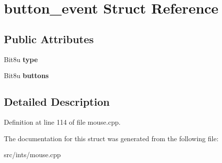 \hypertarget{structbutton__event}{\section{button\-\_\-event Struct Reference}
\label{structbutton__event}
}
\subsection*{Public Attributes}
\begin{DoxyCompactItemize}
\item 
\hypertarget{structbutton__event_a793d0b44cf9339bd85bd3d571830fa51}{Bit8u {\bfseries type}}\label{structbutton__event_a793d0b44cf9339bd85bd3d571830fa51}

\item 
\hypertarget{structbutton__event_abacaa182c19fa91de5e17ee325f6fe88}{Bit8u {\bfseries buttons}}\label{structbutton__event_abacaa182c19fa91de5e17ee325f6fe88}

\end{DoxyCompactItemize}


\subsection{Detailed Description}


Definition at line 114 of file mouse.\-cpp.



The documentation for this struct was generated from the following file\-:\begin{DoxyCompactItemize}
\item 
src/ints/mouse.\-cpp\end{DoxyCompactItemize}
